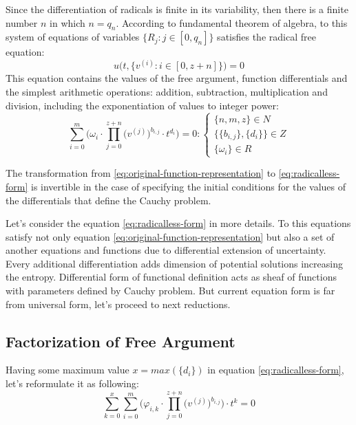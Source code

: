 \documentclass[a4paper, 11pt, oneside]{book}
\begin{document}
Since the differentiation of radicals is finite in its variability, then there is a finite number $n$ in which $n = q_n$. According to fundamental theorem of algebra, to this system of equations of variables $\{R_j: j \in [0, q_n]\}$ satisfies the radical free equation:
\begin{equation}\label{eq:radical-free-equation}
  u\Big(t, \{v^{(i)}: i \in [0, z + n]\}) = 0
\end{equation}
This equation contains the values of the free argument, function differentials and the simplest arithmetic operations: addition, subtraction, multiplication and division, including the exponentiation of values to integer power:
\begin{equation}\label{eq:radicalless-form}
  \sum_{i = 0}^m\bigg(\omega_i \cdot \prod_{j=0}^{z + n} \Big(v^{(j)}\Big)^{b_{i, j}} \cdot t^{d_i}\bigg) = 0:
  \begin{cases}
    \{n, m, z\} \in N \\
    \{\{b_{i, j}\} , \{d_i\}\} \in Z \\
    \{\omega_i\} \in R
  \end{cases}
\end{equation}

The transformation from \ref{eq:original-function-representation} to \ref{eq:radicalless-form} is invertible in the case of specifying the initial conditions for the values of the differentials that define the Cauchy problem.

Let's consider the equation \ref{eq:radicalless-form} in more details. To this equations satisfy not only equation \ref{eq:original-function-representation} but also a set of another equations and functions due to differential extension of uncertainty. Every additional differentiation adds dimension of potential solutions increasing the entropy. Differential form of functional definition acts as sheaf of functions with parameters defined by Cauchy problem. But current equation form is far from universal form, let's proceed to next reductions.

\subsection{Factorization of Free Argument}
Having some maximum value $x = max(\{d_i\})$ in equation \ref{eq:radicalless-form}, let's reformulate it as following:
\begin{equation}
  \sum_{k = 0}^x \sum_{i = 0}^m\bigg(\varphi_{i, k} \cdot \prod_{j=0}^{z + n} \Big(v^{(j)}\Big)^{b_{i, j}}\bigg) \cdot t^k = 0
\end{equation}
\end{document}
